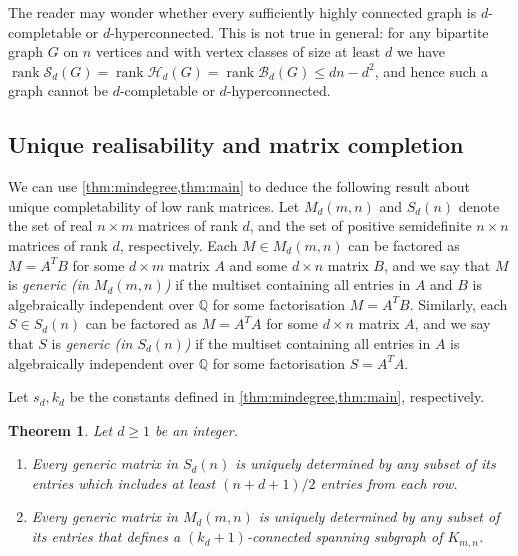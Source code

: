 \documentclass[11pt,a4paper,dvipsnames]{scrartcl}
\newtheorem{theorem}{Theorem}[section]
\newcommand{\rat}{{\mathbb{Q}}}
\newcommand{\cB}{{\mathcal{B}}}
\newcommand{\cS}{{\mathcal{S}}}
\newcommand{\cH}{{\mathcal{H}}}
\newcommand{\locallycompletable}[1]{$d$-completable}
\DeclareMathOperator{\rank}{rank}
\begin{document}
The reader may wonder whether every sufficiently highly connected graph is \locallycompletable{d} or $d$-hyperconnected. This is not true in general: for any bipartite graph $G$ on $n$ vertices and with vertex classes of size at least $d$ we have $\rank \cS_d(G) =\rank \cH_d(G)=\rank \cB_d(G)\leq dn - d^2$, and hence such a graph cannot be \locallycompletable{d} or $d$-hyperconnected.





\subsection{Unique realisability and matrix completion}

We can use \cref{thm:mindegree,thm:main} to deduce the following result about unique completability of low rank matrices. Let $M_d(m,n)$ and $S_d(n)$ denote the set of real $n \times m$ matrices of rank $d$, and the set of 
positive semidefinite
$n \times n$ matrices of rank $d$, respectively. Each $M\in  M_d(m,n)$  can be factored as $M=A^TB$ for some $d\times m$ matrix $A$ and some $d\times n$ matrix $B$, and we say that $M$ is {\em generic (in $M_d(m,n)$) } if the multiset containing all entries in $A$ and $B$ is algebraically independent over $\rat$ for some factorisation $M=A^TB$. 
Similarly, each $S\in  S_d(n)$  can be factored as $M=A^TA$ for some $d\times n$ matrix $A$, and we say that $S$ is {\em generic (in $S_d(n)$)} if the multiset containing all entries in $A$  is algebraically independent over $\rat$ for some factorisation $S=A^TA$.
 



Let $s_d,k_d$ be the constants defined in \cref{thm:mindegree,thm:main}, respectively.


\begin{theorem}\label{thm:matrix} Let $d\geq 1$ be an integer.
    \begin{enumerate}
        \item Every generic matrix in $S_d(n)$  is uniquely determined by any subset of its entries which includes at least $(n + d + 1)/2$ entries from each row.
        \item Every generic matrix in $M_d(m,n)$ is uniquely determined by any subset of its entries that defines a $(k_d+1)$-connected spanning subgraph of $K_{m,n}$.
    \end{enumerate}
\end{theorem}
\end{document}
